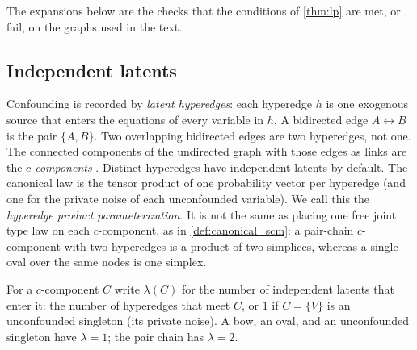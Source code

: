 The expansions below are the checks that the conditions of \cref{thm:lp}
are met, or fail, on the graphs used in the text.

\subsection{Independent latents}
\label{sec:product}

Confounding is recorded by \emph{latent hyperedges}: each hyperedge $h$ is one
exogenous source that enters the equations of every variable in $h$. A
bidirected edge $A\leftrightarrow B$ is the pair $\{A,B\}$. Two overlapping
bidirected edges are two hyperedges, not one. The connected components of the
undirected graph with those edges as links are the
\emph{$c$-components} \citep{tian2002general}. Distinct hyperedges have
independent latents by default. The canonical law is the tensor product of one
probability vector per hyperedge (and one for the private noise of each
unconfounded variable). We call this the \emph{hyperedge product
parameterization}. It is not the same as placing one free joint type law on
each $c$-component, as in \cref{def:canonical_scm}: a pair-chain
$c$-component with two hyperedges is a product of two simplices, whereas a
single oval over the same nodes is one simplex.

For a $c$-component $C$ write $\lambda(C)$ for the number of independent
latents that enter it: the number of hyperedges that meet $C$, or $1$ if
$C=\{V\}$ is an unconfounded singleton (its private noise). A bow, an oval, and
an unconfounded singleton have $\lambda=1$; the pair chain has $\lambda=2$.

